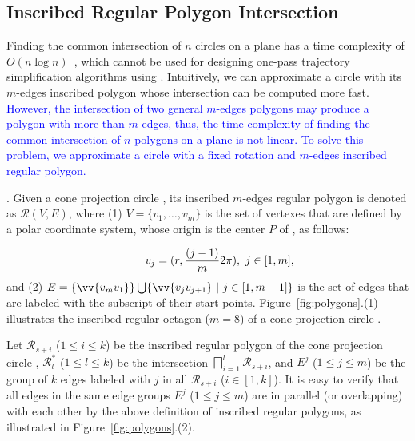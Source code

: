 \subsection{Inscribed Regular Polygon Intersection}
\label{subsec-RPI}

Finding the common intersection of $n$ circles on a plane has a time complexity of ${O(n\log n)}$~\cite{Shamos:Circle}, which cannot be used for designing one-pass trajectory simplification algorithms using \sed.
%
Intuitively, we can approximate a circle with its $m$-edges inscribed polygon {whose intersection can be computed more fast}. \textcolor{blue}{However, the intersection of two general $m$-edges polygons may produce a polygon with more than $m$ edges, thus, the time complexity of finding the common intersection of $n$ polygons on a plane is not linear. To solve this problem, we approximate a circle with a fixed rotation and $m$-edges inscribed regular polygon.}

.
Given a cone projection circle , its inscribed $m$-edges regular polygon is denoted as $\mathcal{R}(V, E)$,
where (1) $V=\{v_1, \ldots, v_{m}\}$ is the set of vertexes that are defined by a polar coordinate system, whose origin is the center $P$ of \pcircle{}, as follows:


\vspace{-2ex}
\begin{equation*}
\label{equ-regular-polygon}
    \begin{aligned}
        \hspace{5ex}  v_j = (r, \frac{(j-1)}{m}2\pi), ~j \in [1, m], \\
    \end{aligned}
\end{equation*}
%
\ni and (2) $E= \{\vv{v_mv_1}\} \bigcup \{\vv{v_jv_{j+1}}\ |\ j\in [1, m-1]\}$ is the set of edges that are labeled with the subscript of their start points.
%
Figure~\ref{fig:polygons}.(1) illustrates the inscribed regular octagon ($m=8$) of a cone projection circle .

Let $\mathcal{R}_{s+i}$ ($1\le i \le k$) be the inscribed regular polygon of the cone projection  circle ,
$\mathcal{R}^*_l$ ($1\le l\le k$) be the intersection $\bigsqcap_{i=1}^{l}\mathcal{R}_{s+i}$,
and $E^j$ ($1\le j \le m$) be the group of $k$ edges labeled with $j$ in all $\mathcal{R}_{s+i}$ ($i\in[1, k]$).
%
It is easy to verify that all edges in the same edge groups $E^j$ ($1\le j\le m$) are in parallel (or overlapping) with each other by the above definition of inscribed regular polygons, as illustrated in Figure~\ref{fig:polygons}.(2).


